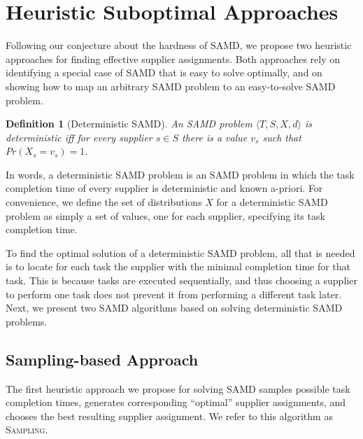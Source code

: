\documentclass[letterpaper]{article} %
\newtheorem{definition}{Definition}
\newcommand{\tuple}[1]{\langle#1\rangle}
\newcommand{\samd}{\ac{SAMD}\xspace}
\newcommand{\sampling}{\textsc{Sampling}\xspace}
\begin{document}
\section{Heuristic Suboptimal Approaches}

Following our conjecture about the hardness of \samd, we propose two heuristic approaches for finding effective supplier assignments. Both approaches rely on identifying a special case of \samd that is easy to solve optimally, and on showing how to map an arbitrary \samd problem to an easy-to-solve \samd problem.


\begin{definition}[Deterministic \samd]
An \samd problem $\tuple{T, S, X, d}$ is \emph{deterministic}
iff for every supplier $s\in S$ there is a value $v_s$ such that $Pr(X_s=v_s)=1$.
\label{def:deterministic}
\end{definition}
In words, a deterministic \samd problem is an \samd problem in which the task completion time of every supplier is deterministic and known a-priori. %
For convenience, we define the set of distributions $X$
for a deterministic \samd problem as simply a set of values, one for each supplier, specifying its task completion time. %

To find the optimal solution of a deterministic \samd problem, all that is needed is to locate for each task the supplier with the minimal completion time for that task. This is because tasks are executed sequentially, and thus choosing a supplier to perform one task does not prevent it from performing a different task later. Next, we present two \samd algorithms based on solving deterministic \samd problems.




\subsection{Sampling-based Approach}\label{sec:sampling}




The first heuristic approach we propose for solving \samd samples possible task completion times, generates corresponding ``optimal'' supplier assignments, and chooses the best resulting supplier assignment. We refer to this algorithm as \sampling.
\end{document}
